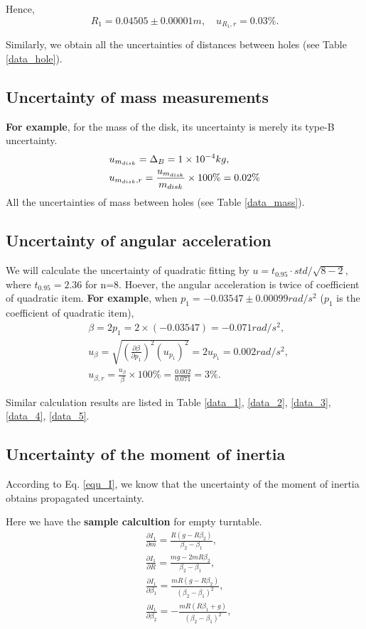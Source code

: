     Hence, 
    \[
        R_1=0.04505\pm 0.00001m,\quad u_{R_1,r}=0.03\%.
    \]

    Similarly, we obtain all the uncertainties of distances between holes (see Table \ref{data_hole}).

\subsection{Uncertainty of mass measurements}
    \textbf{For example}, for the mass of the disk, its uncertainty is merely its type-B uncertainty.
    \[
    \begin{split}
        &u_{m_{disk}}=\Delta_{B}=1\times10^{-4}kg,\\
        &u_{m_{disk},r}=\frac{u_{m_{disk}}}{m_{disk}}\times100\%=0.02\%
    \end{split}
    \]
    All the uncertainties of mass between holes (see Table \ref{data_mass}).

\subsection{Uncertainty of angular acceleration}
    We will calculate the uncertainty of quadratic fitting by $u=t_{0.95}\cdot std/\sqrt{8-2}$, where $t_{0.95}=2.36$ for n=8. Hoever, the angular acceleration is twice of coefficient of quadratic item. \textbf{For example}, when $p_1=-0.03547\pm0.00099 rad/s^2$ ($p_1$ is the coefficient of quadratic item),
    \[
    \begin{split}
        &\beta=2p_1=2\times (-0.03547)=-0.071rad/s^2,\\
        &u_{\beta}=\sqrt{(\frac{\partial \beta}{\partial p_1})^2(u_{p_1})^2}=2u_{p_1}=0.002rad/s^2,\\
        &u_{\beta,r}=\frac{u_{\beta}}{\beta}\times100\%=\frac{0.002}{0.071}=3\%.
    \end{split}
    \]

    Similar calculation results are listed in Table \ref{data_1}, \ref{data_2}, \ref{data_3}, \ref{data_4}, \ref{data_5}.

\subsection{Uncertainty of the moment of inertia}
    According to Eq. \ref{equ_I}, we know that the uncertainty of the moment of inertia obtains propagated uncertainty.

    Here we have the \textbf{sample calcultion} for empty turntable.
    \[
    \begin{split}
        &\frac{\partial I_1}{\partial m}=\frac{R(g-R\beta_2)}{\beta_2-\beta_1},\\
        &\frac{\partial I_1}{\partial R}=\frac{mg-2mR\beta_2}{\beta_2-\beta_1},\\
        &\frac{\partial I_1}{\partial \beta_1}=\frac{mR(g-R\beta_2)}{(\beta_2-\beta_1)^2},\\
        &\frac{\partial I_1}{\partial \beta_2}=-\frac{mR(R\beta_1+g)}{(\beta_2-\beta_1)^2},\\
        \end{split}
    \]

